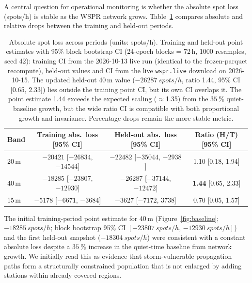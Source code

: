 \documentclass{agujournal2019}
\begin{document}
A central question for operational monitoring is whether the absolute
spot loss (spots/h) is stable as the WSPR network grows.
Table~\ref{tab:baseline} compares absolute and relative drops between
the training and held-out periods.

\begin{table}[h]
	\centering
	\small
	\setlength{\tabcolsep}{5pt}
	\caption{Absolute spot loss across periods (units: spots/h).
		Training and held-out point estimates with 95\% block bootstrap CI
		(24-epoch blocks = 72\,h, 1000 resamples, seed 42): training CI from
		the 2026-10-13 live run (identical to the frozen-parquet recompute),
		held-out values and CI from the live \texttt{wspr.live} download on
		2026-10-15. The updated
		held-out 40\,m value ($\SI{-26287}{spots/h}$, ratio 1.44, 95\% CI
		[0.65, 2.33]) lies outside the training point CI, but its own CI
		overlaps it. The point estimate 1.44 exceeds the expected scaling
		($\approx$1.35) from the $\SI{+35}{\percent}$ quiet-baseline
		growth, but the wide ratio CI is compatible with both proportional
		growth and invariance.
		Percentage drops remain the more stable metric.\protect\footnotemark{}}
	\label{tab:baseline}
	\begin{tabular}{lccc}
		\toprule
		Band  & Training abs.\ loss [95\% CI] & Held-out abs.\ loss [95\% CI]
		& Ratio (H/T) [95\% CI] \\
		\midrule
		20\,m & $\num{-20421}$ [$\num{-26834}$, $\num{-14544}$]
		& $\num{-22482}$ [$\num{-35044}$, $\num{-2938}$]
		& 1.10 [0.18, 1.94] \\
		40\,m & $\num{-18285}$ [$\num{-23807}$, $\num{-12930}$]
		& $\num{-26287}$ [$\num{-37144}$, $\num{-12472}$]
		& \textbf{1.44} [0.65, 2.33] \\
		15\,m & $\num{-5178}$ [$\num{-6671}$, $\num{-3684}$]
		& $\num{-3627}$ [$\num{-7172}$, $\num{3738}$]
		& 0.70 [0.05, 1.57] \\
		\bottomrule
	\end{tabular}
\end{table}

{\sloppy The initial training-period point estimate for 40\,m
(Figure~\ref{fig:baseline}; $\SI{-18285}{spots/h}$; block bootstrap 95\% CI
$[\SI{-23807}{spots/h},\, \SI{-12930}{spots/h}]$) and the first
held-out snapshot ($\SI{-18304}{spots/h}$) were consistent with a
constant absolute loss despite a $\SI{+35}{\percent}$ increase in the
quiet-time baseline from network growth. We initially read this as
evidence that storm-vulnerable propagation paths form a structurally
constrained population that is not enlarged by adding stations within
already-covered regions.\par}
\end{document}
